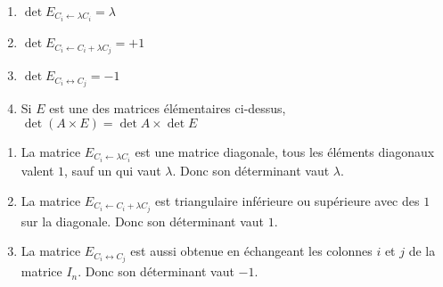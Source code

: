 \documentclass{book}
\begin{document}
\begin{Proposition}
\begin{enumerate}
  \item $\det E_{C_i \leftarrow \lambda C_i} = \lambda$
  \item $\det E_{C_i \leftarrow C_i+\lambda C_j} = +1$
  \item $\det E_{C_i \leftrightarrow C_j} = -1$
  \item Si $E$ est une des matrices élémentaires ci-dessus, $\det \left( A \times E \right) = \det A \times \det E$
\end{enumerate}
\end{Proposition}


\begin{Demonstration}
\begin{enumerate}
  \item La matrice $E_{C_i \leftarrow \lambda C_i}$ est une matrice diagonale,
  tous les éléments diagonaux valent $1$, sauf un qui vaut $\lambda$. Donc son déterminant
  vaut $\lambda$.
  \item La matrice $E_{C_i \leftarrow C_i+\lambda C_j}$ est triangulaire inférieure
  ou supérieure avec des $1$ sur la diagonale. Donc son déterminant
  vaut $1$.
  \item La matrice $E_{C_i \leftrightarrow C_j}$ est aussi obtenue en échangeant
les colonnes $i$ et $j$ de la matrice $I_n$. Donc son déterminant
  vaut $-1$.
\end{enumerate}
\end{Demonstration}
\end{document}
